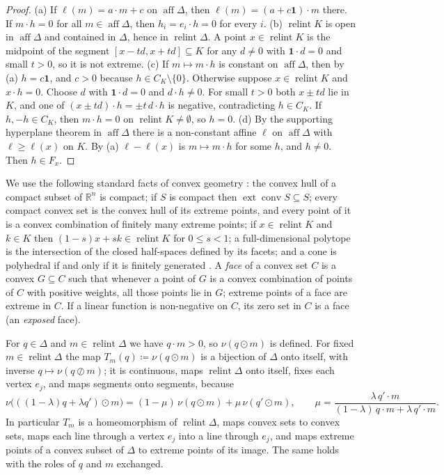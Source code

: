 \documentclass[11pt]{article}
\newcommand{\R}{\mathbb{R}}
\newcommand{\one}{\mathbf{1}}
\DeclareMathOperator{\conv}{conv}
\DeclareMathOperator{\relint}{relint}
\DeclareMathOperator{\aff}{aff}
\DeclareMathOperator{\ext}{ext}
\theoremstyle{plain}
\theoremstyle{definition}
\theoremstyle{remark}
\begin{document}
\begin{proof}
(a) If $\ell(m)=a\cdot m+c$ on $\aff\Delta$, then $\ell(m)=(a+c\one)\cdot m$ there. If
$m\cdot h=0$ for all $m\in\aff\Delta$, then $h_i=e_i\cdot h=0$ for every $i$.
(b) $\relint K$ is open in $\aff\Delta$ and contained in $\Delta$, hence in $\relint\Delta$.
A point $x\in\relint K$ is the midpoint of the segment $[x-td,x+td]\subseteq K$ for any
$d\neq0$ with $\one\cdot d=0$ and small $t>0$, so it is not extreme.
(c) If $m\mapsto m\cdot h$ is constant on $\aff\Delta$, then by (a) $h=c\one$, and $c>0$
because $h\in C_K\setminus\{0\}$. Otherwise suppose $x\in\relint K$ and $x\cdot h=0$.
Choose $d$ with $\one\cdot d=0$ and $d\cdot h\neq0$. For small $t>0$ both $x\pm td$ lie in
$K$, and one of $(x\pm td)\cdot h=\pm t\,d\cdot h$ is negative, contradicting $h\in C_K$.
If $h,-h\in C_K$, then $m\cdot h=0$ on $\relint K\ne\emptyset$, so $h=0$.
(d) By the supporting hyperplane theorem in $\aff\Delta$ \cite[Thm.~11.6]{Rockafellar}
there is a non-constant affine $\ell$ on $\aff\Delta$ with $\ell\ge\ell(x)$ on $K$. By (a)
$\ell-\ell(x)$ is $m\mapsto m\cdot h$ for some $h$, and $h\neq0$. Then $h\in F_x$.
\end{proof}

We use the following standard facts of convex geometry \cite{Rockafellar,Schrijver}: the
convex hull of a compact subset of $\R^n$ is compact; if $S$ is compact then $\ext\conv
S\subseteq S$; every compact convex set is the convex hull of its extreme points, and every
point of it is a convex combination of finitely many extreme points; if $x\in\relint K$ and
$k\in K$ then $(1-s)x+sk\in\relint K$ for $0\le s<1$; a full-dimensional polytope is the
intersection of the closed half-spaces defined by its facets; and a cone is polyhedral if
and only if it is finitely generated \cite[Cor.~7.1a]{Schrijver}. A \emph{face} of a convex
set $C$ is a convex $G\subseteq C$ such that whenever a point of $G$ is a convex
combination of points of $C$ with positive weights, all those points lie in $G$; extreme
points of a face are extreme in $C$. If a linear function is non-negative on $C$, its zero
set in $C$ is a face (an \emph{exposed} face).

For $q\in\Delta$ and $m\in\relint\Delta$ we have $q\cdot m>0$, so $\nu(q\odot m)$ is
defined. For fixed $m\in\relint\Delta$ the map $T_m(q)\coloneqq\nu(q\odot m)$ is a bijection
of $\Delta$ onto itself, with inverse $q\mapsto\nu(q\oslash m)$; it is continuous, maps
$\relint\Delta$ onto itself, fixes each vertex $e_j$, and maps segments onto segments,
because
\begin{equation}\label{eq:proj}
  \nu\bigl(((1-\lambda)q+\lambda q')\odot m\bigr)=(1-\mu)\,\nu(q\odot m)+\mu\,\nu(q'\odot m),
  \qquad \mu=\frac{\lambda\, q'\cdot m}{(1-\lambda)\,q\cdot m+\lambda\,q'\cdot m}.
\end{equation}
In particular $T_m$ is a homeomorphism of $\relint\Delta$, maps convex sets to convex sets,
maps each line through a vertex $e_j$ into a line through $e_j$, and maps extreme points of
a convex subset of $\Delta$ to extreme points of its image. The same holds with the roles
of $q$ and $m$ exchanged.
\end{document}
